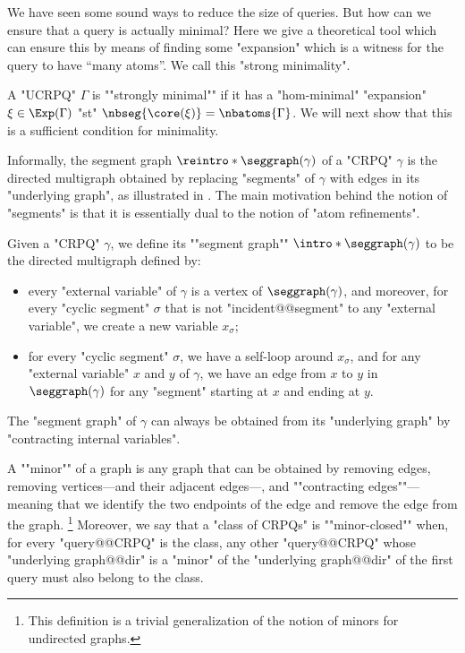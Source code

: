 We have seen some sound ways to reduce the size of queries. But how can we ensure that a query is actually minimal? Here we give a theoretical tool which can ensure this by means of finding some "expansion" which is a witness for the query to have ``many atoms''. We call this "strong minimality".

A "UCRPQ" $\Gamma$ is \AP""strongly minimal"" if 
it has a "hom-minimal" "expansion" $\anexpansion \in \Exp(\Gamma)$ "st" $\nbseg{\core(\anexpansion)} = \nbatoms{\Gamma}$. We will next show that this is a sufficient condition for minimality.

Informally, the segment graph $\reintro*\seggraph(\gamma)$ of a "CRPQ" $\gamma$ is the directed multigraph obtained by replacing "segments" of $\gamma$ with edges in its "underlying graph", as illustrated in . The main motivation behind the notion of "segments" is 
that it is essentially dual to the notion of "atom refinements".

\begin{definition}
	\AP\label{defn:segmentgraph}
	Given a "CRPQ" $\gamma$, we define its \AP""segment graph"" $\intro*\seggraph(\gamma)$
	to be the directed multigraph defined by:
	\begin{itemize}
		\item every "external variable" of $\gamma$ is a vertex of $\seggraph(\gamma)$,
			and moreover, for every "cyclic segment" $\sigma$
			that is not "incident@@segment" to any "external variable", we create a new variable
			$x_\sigma$;
		\item for every "cyclic segment" $\sigma$, we have a self-loop around $x_{\sigma}$,
			and for any "external variable" $x$ and $y$ of $\gamma$, we have an edge
			from $x$ to $y$ in $\seggraph(\gamma)$ for any "segment" starting at $x$ and
			ending at $y$.
	\end{itemize}
\end{definition}

\begin{fact}
	\AP\label{fact:segment-graph-is-contraction}
	The "segment graph" of $\gamma$ can always be obtained from its "underlying
	graph" by "contracting internal variables". 
\end{fact}

A \AP""minor"" of a graph is any graph that can be obtained by removing
edges, removing vertices---and their adjacent edges---, and \AP""contracting edges""---meaning that we identify the two endpoints of the edge and remove the edge from the graph.%
\footnote{This definition is a trivial generalization of the notion of minors for undirected graphs.} Moreover, we say that a "class of CRPQs" is ""minor-closed"" when, for every
"query@@CRPQ" is the class, any other "query@@CRPQ" whose "underlying graph@@dir" 
is a "minor" of the "underlying graph@@dir" of the first query must also
belong to the class.

